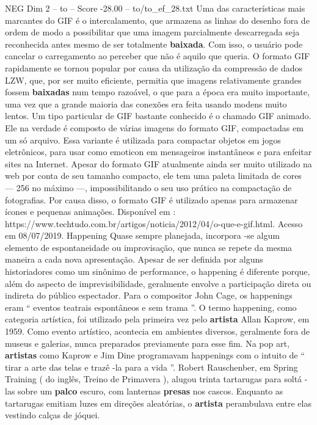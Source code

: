 \begin{textsample}{NEG Dim 2 – to – Score -28.00 – to/to\_ef\_28.txt}
Uma das características mais marcantes do GIF é o intercalamento, que armazena as linhas do desenho fora de ordem de modo a possibilitar que uma imagem parcialmente descarregada seja reconhecida antes mesmo de ser totalmente \textbf{baixada}.
Com isso, o usuário pode cancelar o carregamento ao perceber que não é aquilo que queria.
O formato GIF rapidamente se tornou popular por causa da utilização da compressão de dados LZW, que, por ser muito eficiente, permitia que imagens relativamente grandes fossem \textbf{baixadas} num tempo razoável, o que para a época era muito importante, uma vez que a grande maioria das conexões era feita usando modens muito lentos.
Um tipo particular de GIF bastante conhecido é o chamado GIF animado.
Ele na verdade é composto de várias imagens do formato GIF, compactadas em um só arquivo.
Essa variante é utilizada para compactar objetos em jogos eletrônicos, para usar como emoticon em mensageiros instantâneos e para enfeitar sites na Internet.
Apesar do formato GIF atualmente ainda ser muito utilizado na web por conta de seu tamanho compacto, ele tem uma paleta limitada de cores — 256 no máximo —, impossibilitando o seu uso prático na compactação de fotografias.
Por causa disso, o formato GIF é utilizado apenas para armazenar ícones e pequenas animações.
Disponível em : https://www.techtudo.com.br/artigos/noticia/2012/04/o-que-e-gif.html.
Acesso em 08/07/2019.
Happening Quase sempre planejada, incorpora -se algum elemento de espontaneidade ou improvisação, que nunca se repete da mesma maneira a cada nova apresentação.
Apesar de ser definida por alguns historiadores como um sinônimo de performance, o happening é diferente porque, além do aspecto de imprevisibilidade, geralmente envolve a participação direta ou indireta do público espectador.
Para o compositor John Cage, os happenings eram “ eventos teatrais espontâneos e sem trama ”.
O termo happening, como categoria artística, foi utilizado pela primeira vez pelo \textbf{artista} Allan Kaprow, em 1959.
Como evento artístico, acontecia em ambientes diversos, geralmente fora de museus e galerias, nunca preparados previamente para esse fim.
Na pop art, \textbf{artistas} como Kaprow e Jim Dine programavam happenings com o intuito de “ tirar a arte das telas e trazê -la para a vida ”.
Robert Rauschenber, em Spring Training ( do inglês, Treino de Primavera ), alugou trinta tartarugas para soltá -las sobre um \textbf{palco} escuro, com lanternas \textbf{presas} nos cascos.
Enquanto as tartarugas emitiam luzes em direções aleatórias, o \textbf{artista} perambulava entre elas vestindo calças de jóquei.

\end{textsample}
